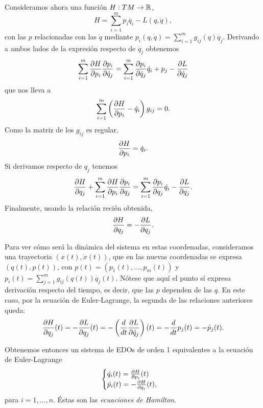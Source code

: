   Consideramos ahora una función $H:TM\rightarrow \mathbb{R}$,
  \begin{equation*}
    H=\sum_{i=1}^m p_i \dot{q_i} - L(q,\dot{q}),
  \end{equation*}
  con las $p$ relacionadas con las $\dot{q}$ mediante $p_i(q,\dot{q})=\sum_{i=1}^m g_{ij}(q) \dot{q_j}$. Derivando a ambos lados de la expresión respecto de $\dot{q}_j$ obtenemos
  \begin{equation*}
    \sum_{i=1}^m \frac{\partial H}{\partial p_i}\frac{\partial p_i}{\partial \dot{q}_j}=\sum_{i=1}^m \frac{\partial p_i}{\partial \dot{q}_j}\dot{q}_i + p_j - \frac{\partial L}{\partial \dot{q}_j}
  \end{equation*}
  que nos lleva a
  \begin{equation*}
    \sum_{i=1}^m \left( \frac{\partial H}{\partial p_i}-\dot{q}_i \right)g_{ij}=0.
  \end{equation*}
  Como la matriz de los $g_{ij}$ es regular,
  \begin{equation*}
    \frac{\partial H}{\partial p_i}=\dot{q}_i.
  \end{equation*}
  Si derivamos respecto de $q_j$ tenemos
  \begin{equation*}
    \frac{\partial H}{\partial q_j}+\sum_{i=1}^m \frac{\partial H}{\partial p_i}\frac{\partial p_i}{\partial q_j}= \sum_{i=1}^m \frac{\partial p_i}{\partial q_j} \dot{q_i} - \frac{\partial L}{\partial q_j}.
  \end{equation*}
  Finalmente, usando la relación recién obtenida,
  \begin{equation*}
    \frac{\partial H}{\partial q_j}=-\frac{\partial L}{\partial q_j}.
  \end{equation*}

  Para ver cómo será la dinámica del sistema en estas coordenadas, consideramos una trayectoria $(x(t),\dot{x}(t))$, que en las nuevas coordenadas se expresa $(q(t),p(t))$, con $p(t)=(p_1(t),\dots,p_m(t))$ y $p_i(t)=\sum_{j=1}^m g_{ij}(q(t)) \dot{q_j}(t)$. Nótese que aquí el punto sí expresa derivación respecto del tiempo, es decir, que las $p$ dependen de las $q$. En este caso, por la ecuación de Euler-Lagrange, la segunda de las relaciones anteriores queda:
  \begin{equation*}
    \frac{\partial H}{\partial q_j}(t)=-\frac{\partial L}{\partial q_j}(t)=-\left(\frac{d}{dt} \frac{\partial L}{\partial \dot{q}_j} \right)(t)= - \frac{d}{dt}p_j(t) = -\dot{p}_j(t).
  \end{equation*}
  
  Obtenemos entonces un sistema de EDOs de orden 1 equivalentes a la ecuación de Euler-Lagrange
  \begin{align}
    \begin{cases}
    \dot{q_i}(t)=\frac{\partial H}{\partial p_i}(t) \\
      \dot{p_i}(t)=-\frac{\partial H}{\partial q_i}(t),
    \end{cases}
    \label{hamilton}
  \end{align}
  para $i=1,\dots,n$. Éstas son las \emph{ecuaciones de Hamilton}.
  
